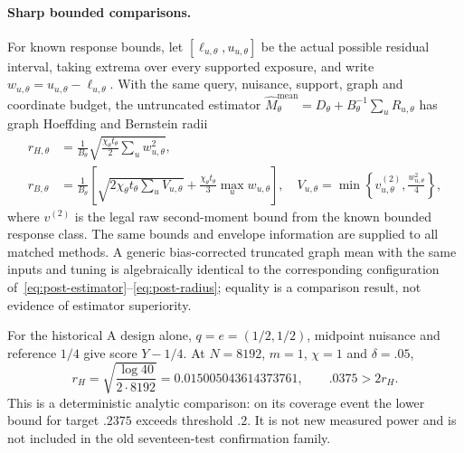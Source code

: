 \paragraph{Sharp bounded comparisons.}
For known response bounds, let $[\ell_{u,\theta},u_{u,\theta}]$ be the actual
possible residual interval, taking extrema over every supported exposure, and
write $w_{u,\theta}=u_{u,\theta}-\ell_{u,\theta}$. With the same query, nuisance,
support, graph and coordinate budget, the untruncated estimator
$\widehat M^{\mathrm{mean}}_\theta=D_\theta+B_\theta^{-1}\sum_u R_{u,\theta}$
has graph Hoeffding and Bernstein radii
\begin{align}
 r_{H,\theta}
 &=\frac{1}{B_\theta}
       \sqrt{\frac{\chi_\theta t_\theta}{2}\sum_u w_{u,\theta}^2},
 \label{eq:post-hoeffding}\\
 r_{B,\theta}
 &=\frac{1}{B_\theta}\left[
       \sqrt{2\chi_\theta t_\theta\sum_u V_{u,\theta}}
       +\frac{\chi_\theta t_\theta}{3}\max_u w_{u,\theta}\right],
 \quad
 V_{u,\theta}=\min\left\{v^{(2)}_{u,\theta},
                               \frac{w_{u,\theta}^2}{4}\right\},
 \label{eq:post-bernstein}
\end{align}
where $v^{(2)}$ is the legal raw second-moment bound from the known bounded
response class. The same bounds and envelope information are supplied to all
matched methods. A generic bias-corrected truncated graph mean with the same
inputs and tuning is algebraically identical to the corresponding
configuration of~\eqref{eq:post-estimator}--\eqref{eq:post-radius}; equality is
a comparison result, not evidence of estimator superiority.

For the historical A design alone, $q=e=(1/2,1/2)$, midpoint nuisance and
reference $1/4$ give score $Y-1/4$. At $N=8192$, $m=1$, $\chi=1$ and
$\delta=.05$,
\begin{equation}
 r_H=\sqrt{\frac{\log 40}{2\cdot8192}}
       =0.015005043614373761,
 \qquad
 .0375>2r_H.
 \label{eq:post-A-fixture}
\end{equation}
This is a deterministic analytic comparison: on its coverage event the lower
bound for target $.2375$ exceeds threshold $.2$. It is not new measured power
and is not included in the old seventeen-test confirmation family.

